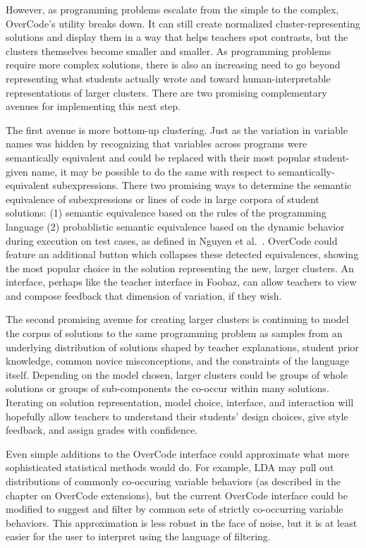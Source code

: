 However, as programming problems escalate from the simple to the complex, OverCode's utility breaks down. It can still create normalized cluster-representing solutions and display them in a way that helps teachers spot contrasts, but the clusters themselves become smaller and smaller. As programming problems require more complex solutions, there is also an increasing need to go beyond representing what students actually wrote and toward human-interpretable representations of larger clusters. There are two promising complementary avenues for implementing this next step.

The first avenue is more bottom-up clustering. Just as the variation in variable names was hidden by recognizing that variables across programs were semantically equivalent and could be replaced with their most popular student-given name, it may be possible to do the same with respect to semantically-equivalent subexpressions. There two promising ways to determine the semantic equivalence of subexpressions or lines of code in large corpora of student solutions: (1) semantic equivalence based on the rules of the programming language (2) probablistic semantic equivalence based on the dynamic behavior during execution on test cases, as defined in Nguyen et al.~\cite{codewebs}. OverCode could feature an additional button which collapses these detected equivalences, showing the most popular choice in the solution representing the new, larger clusters. An interface, perhaps like the teacher interface in Foobaz, can allow teachers to view and compose feedback that dimension of variation, if they wish. 

The second promising avenue for creating larger clusters is continuing to model the corpus of solutions to the same programming problem as samples from an underlying distribution of solutions shaped by teacher explanations, student prior knowledge, common novice misconceptions, and the constraints of the language itself. Depending on the model chosen, larger clusters could be groups of whole solutions or groups of sub-components the co-occur within many solutions. Iterating on solution representation, model choice, interface, and interaction will hopefully allow teachers to understand their students' design choices, give style feedback, and assign grades with confidence. 

Even simple additions to the OverCode interface could approximate what more sophisticated statistical methods would do. For example, LDA may pull out distributions of commonly co-occuring variable behaviors (as described in the chapter on OverCode extensions), but the current OverCode interface could be modified to suggest and filter by common sets of strictly co-occurring variable behaviors. This approximation is less robust in the face of noise, but it is at least easier for the user to interpret using the language of filtering. %

